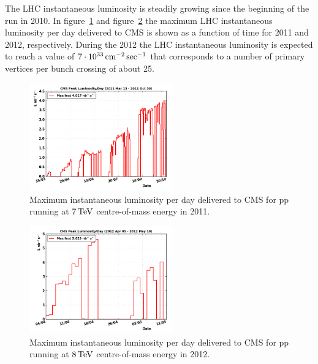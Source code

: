 The LHC instantaneous luminosity is steadily growing since the
beginning of the run in 2010. In figure~\ref{fig:LHCinstLumi2011} and
figure~\ref{fig:LHCinstLumi2012} the maximum LHC instantaneous
luminosity per day delivered to CMS is shown as a function of time for 2011 and 
2012, respectively. During the 2012 the LHC instantaneous luminosity is expected to
reach a value of $7\cdot10^{33}\rm \, cm^{-2}\sec^{-1}$ that corresponds to a number
of primary vertices per bunch crossing of about 25.
\begin{figure}[t]
\includegraphics*[width=0.55\textwidth]{figs/lumipeak-2011.png}\hspace{0.02\textwidth}%
\begin{minipage}[b]{0.33\textwidth}\caption{\label{fig:LHCinstLumi2011}Maximum
    instantaneous luminosity per day delivered to CMS for pp running at $7{\rm \, TeV}$ centre-of-mass energy in 2011.} 
\end{minipage}
\end{figure}
\begin{figure}[b]
\includegraphics*[width=0.55\textwidth]{figs/lumipeak-pp-2012.png}\hspace{0.02\textwidth}%
\begin{minipage}[b]{0.33\textwidth}\caption{\label{fig:LHCinstLumi2012}Maximum
    instantaneous luminosity per day delivered to CMS for 
  pp running at $8{\rm \, TeV}$ centre-of-mass energy in 2012.} 
\end{minipage}
\end{figure}

